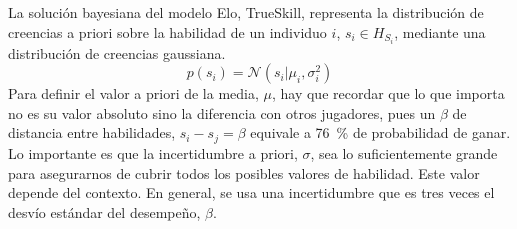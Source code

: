 \documentclass[a4paper,11pt]{book}
\newcommand{\N}{\mathcal{N}}
\theoremstyle{definition}
\begin{document}
La soluci\'on bayesiana del modelo Elo, TrueSkill, representa la distribuci\'on de creencias a priori sobre la habilidad de un individuo $i$, $s_i \in H_{S_i}$, mediante una distribuci\'on de creencias gaussiana.
%
\begin{equation}
p(s_i) = \N(s_i | \mu_i, \sigma_i^2)
\end{equation}
%
Para definir el valor a priori de la media, $\mu$, hay que recordar que lo que importa no es su valor absoluto sino la diferencia con otros jugadores, pues un $\beta$ de distancia entre habilidades, $s_i-s_j=\beta$ equivale a \SI{76}{\percent} de probabilidad de ganar.
%
Lo importante es que la incertidumbre a priori, $\sigma$, sea lo suficientemente grande para asegurarnos de cubrir todos los posibles valores de habilidad.
%
Este valor depende del contexto.
%
En general, se usa una incertidumbre que es tres veces el desv\'io est\'andar del desempe\~no, $\beta$.

\end{document}
